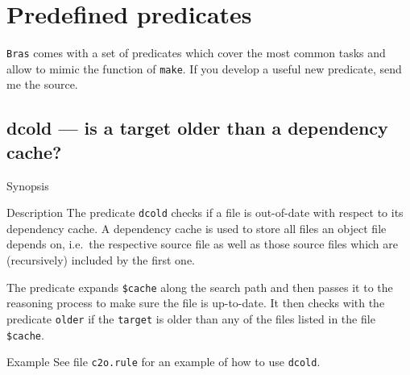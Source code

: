 \documentclass[11pt,bibtotoc,idxtotoc]{scrreprt}
\newcommand{\Bras}{\texttt{Bras}}
\newcommand{\make}{\texttt{make}}
\begin{document}
\section{Predefined predicates}
\label{sec:predicates}

\Bras{} comes with a set of predicates which cover the most common
tasks and allow to mimic the function of \make{}. If you develop a
useful new predicate, send me the source.

\subsection{dcold --- is a target older than a dependency cache?}
\label{pred:dcold}
\begin{Describe}
\item[Synopsis]  
\item[Description] The predicate \texttt{dcold} checks if a file is
  out-of-date with respect to its dependency cache. A dependency cache
  is used to store all files an object file depends on, i.e.\ the
  respective source file as well as those source files which are
  (recursively) included by the first one.
  
  The predicate expands \texttt{\$cache} along the search path and
  then passes it to the reasoning process to make sure the file is
  up-to-date. It then checks with the predicate \texttt{older} if the
  \texttt{target} is older than any of the files listed in the file
  \texttt{\$cache}.
\item[Example] See file \texttt{c2o.rule} for an example of how to use 
  \texttt{dcold}.
\end{Describe}


\end{document}
